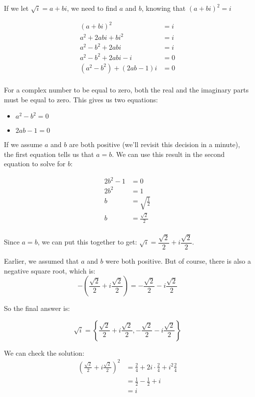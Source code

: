 \documentclass[fleqn,addpoints]{exam}
\begin{document}
\begin{solution}

If we let $\sqrt{i} = a + bi$, we need to find $a$ and $b$, knowing that $(a + bi)^2 = i$

\begin{align*}
  (a + bi)^2 &= i \\
  a^2 + 2abi + bi^2 &= i \\
  a^2 - b^2 + 2abi &= i \\
  a^2 - b^2 + 2abi - i &= 0 \\
  (a^2 - b^2) + (2ab - 1) i &= 0 \\
\end{align*}

For a complex number to be equal to zero, both the real and the imaginary parts must be equal to zero.  This gives us
two equations: 

\begin{itemize}
  \item $a^2 - b^2 = 0$
  \item $2ab - 1 = 0$
\end{itemize}

If we assume $a$ and $b$ are both positive (we'll revisit this decision in a minute), the first equation tells us that
$a = b$.  We can use this result in the second equation to solve for $b$: 

\begin{align*}
  2b^2 - 1 &= 0 \\
  2b^2 &= 1 \\
  b &= \sqrt{\frac{1}{2}} \\
  b &= \frac{\sqrt{2}}{2} \\
\end{align*}

Since $a=b$, we can put this together to get: $\sqrt{i} = \dfrac{\sqrt{2}}{2} + i \dfrac{\sqrt{2}}{2}$.  

Earlier, we assumed that $a$ and $b$ were both positive.  But of course, there is also a negative square root, which is:
\[
  - \left( \frac{\sqrt{2}}{2} + i \frac{\sqrt{2}}{2} \right) = -\frac{\sqrt{2}}{2} - i \frac{\sqrt{2}}{2}
\]

So the final answer is:

\[
  \sqrt{i} = \left \{ \frac{\sqrt{2}}{2} + i \dfrac{\sqrt{2}}{2}, - \frac{\sqrt{2}}{2} - i \dfrac{\sqrt{2}}{2} \right \}
\]

We can check the solution:
\begin{align*}
  \left( \frac{\sqrt{2}}{2} + i \frac{\sqrt{2}}{2} \right)^2 &= \frac{2}{4} + 2 i \cdot \frac{2}{4} + i^2 \frac{2}{4} \\
  &= \frac{1}{2} - \frac{1}{2} + i \\
  &= i
\end{align*}

\end{solution}
\end{document}
